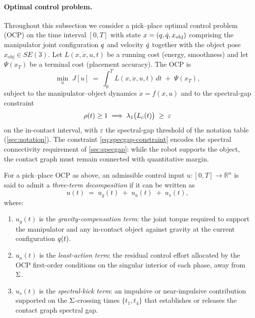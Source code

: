 \paragraph{Optimal control problem.}
Throughout this subsection we consider a pick--place optimal
control problem (OCP) on the time interval $[0, T]$ with state
$x = (q, \dot{q}, x_{\mathrm{obj}})$ comprising
the manipulator joint configuration $q$ and velocity
$\dot{q}$ together with the object pose
$x_{\mathrm{obj}} \in SE(3)$. Let $L(x, \dot x, u, t)$ be a
running cost (energy, smoothness) and let $\Psi(x_{T})$ be a
terminal cost (placement accuracy). The OCP is
\begin{equation}
\label{eq:ocp}
  \min_{u} \;
  J[u]
  \;=\;
  \int_{0}^{T} L(x, \dot x, u, t)\,dt
  \;+\; \Psi(x_{T}),
\end{equation}
subject to the manipulator--object dynamics $\dot x = f(x, u)$
and to the spectral-gap constraint
\begin{equation}
\label{eq:specgap-constraint}
  \rho(t) \ge 1
  \;\Longrightarrow\;
  \lambda_{1}\bigl(L_{c}(t)\bigr) \;\ge\; \varepsilon
\end{equation}
on the in-contact interval, with $\varepsilon$ the spectral-gap
threshold of the notation table (\cref{sec:notation}). The
constraint \eqref{eq:specgap-constraint} encodes the spectral
connectivity requirement of \cref{sec:specgap}: while the robot
supports the object, the contact graph must remain connected with
quantitative margin.

\begin{definition}\label{def:three-term}
For a pick--place OCP as above, an admissible control input
$u \colon [0, T] \to \mathbb{R}^{n}$ is said to admit a
\emph{three-term decomposition} if it can be written as
\begin{equation}
\label{eq:three-term}
  u(t) \;=\; u_{g}(t) \;+\; u_{a}(t) \;+\; u_{s}(t),
\end{equation}
where:
\begin{enumerate}[label=(\roman*),nosep]
  \item $u_{g}(t)$ is the \emph{gravity-compensation term}: the
    joint torque required to support the manipulator and any
    in-contact object against gravity at the current configuration
    $q(t)$.
  \item $u_{a}(t)$ is the \emph{least-action term}: the residual
    control effort allocated by the OCP first-order conditions on
    the singular interior of each phase, away from $\Sigma$.
  \item $u_{s}(t)$ is the \emph{spectral-kick term}: an impulsive
    or near-impulsive contribution supported on the
    $\Sigma$-crossing times $\{t_{1}, t_{4}\}$ that establishes
    or releases the contact graph spectral gap.
\end{enumerate}
\end{definition}

